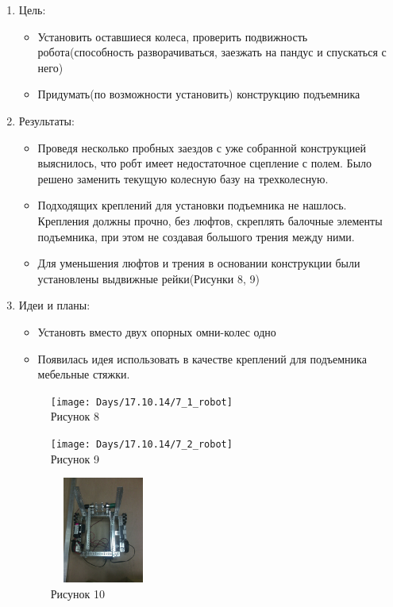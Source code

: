 
	\begin{enumerate}
	\item Цель:
		\begin{itemize}
		\item Установить оставшиеся колеса, проверить подвижность робота(способность разворачиваться, заезжать на пандус и спускаться с него)
		\item Придумать(по возможности установить) конструкцию подъемника
		\end{itemize}
	\item Результаты:
		\begin{itemize}
		\item Проведя несколько пробных заездов с уже собранной конструкцией выяснилось, что робт имеет недостаточное сцепление с полем. Было решено заменить текущую колесную базу на трехколесную.
		\item Подходящих креплений для установки подъемника не нашлось. Крепления должны прочно, без люфтов, скреплять балочные элементы подъемника, при этом не создавая большого трения между ними.
		\item Для уменьшения люфтов и трения в основании конструкции были установлены выдвижные рейки(Рисунки 8, 9)
		\end{itemize}
	\item Идеи и планы:
		\begin{itemize}
		\item Установть вместо двух опорных омни-колес одно
		\item Появилась идея использовать в качестве креплений для подъемника мебельные стяжки.
		\end{itemize}
	\begin{figure} [h]
			\centering
			\begin{minipage}{0.3\linewidth}
				\texttt{[image: Days/17.10.14/7\_1\_robot]}\\ Рисунок 8
			\end{minipage}
			\begin{minipage}{0.3\linewidth}
				\texttt{[image: Days/17.10.14/7\_2\_robot]}\\ Рисунок 9
			\end{minipage}
			\begin{minipage}{0.3\linewidth}
				\includegraphics[width=35mm,height=35mm]{Days/17.10.14/7_3_robot}\\ Рисунок 10
			\end{minipage}		
	\end{figure}
	\end{enumerate}
\newpage